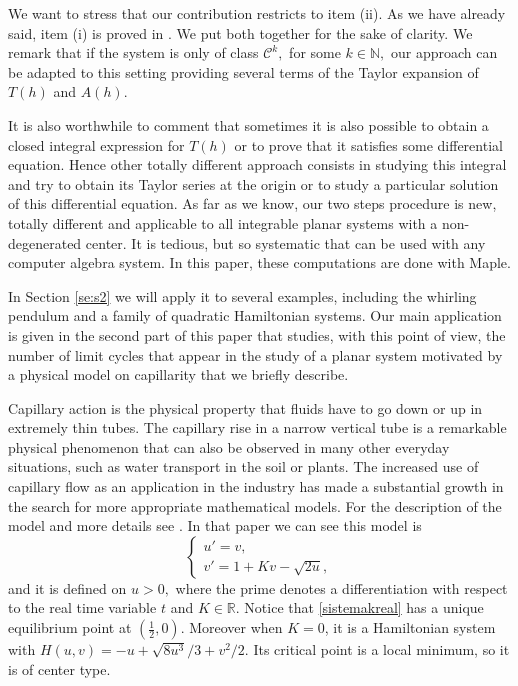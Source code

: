 \documentclass[12pt,a4paper,reqno]{amsart}
\newcommand{\R}{\mathbb{R}}
\newcommand{\N}{\mathbb{N}}
\begin{document}
We want to stress that our contribution restricts to item (ii). As
we have already said, item (i) is proved in \cite{ManVil2002}. We
put both together for the sake of clarity. We remark that if the
system is only of class $\mathcal{C}^k,$ for some $k\in\N,$ our
approach can be adapted to this setting providing several terms of
the Taylor expansion of $T(h)$ and $A(h).$

It is also  worthwhile  to comment that sometimes it is also
possible to obtain a closed integral   expression for $T(h)$ or to
prove that it satisfies some differential equation.  Hence other
totally different approach consists in studying this integral and
try to obtain its Taylor series at the origin or to study a
particular solution of this differential equation. As far as we
know, our two steps procedure is new, totally different and
applicable to all integrable planar systems with a non-degenerated
center. It is tedious, but so systematic that can be used with any
computer algebra system. In this paper, these computations are done
with Maple.

In Section \ref{se:s2} we will apply it to several examples,
including the whirling pendulum and a family of quadratic
Hamiltonian systems. Our main application is given in the second
part of this paper that studies, with this point of view, the number
of limit cycles that appear in the study of a planar  system
motivated by a physical model on capillarity that we briefly
describe.

Capillary action is the physical property that fluids have to go
down or up
    in extremely thin tubes.
     The capillary rise in a narrow vertical tube is
     a remarkable physical phenomenon that can also be observed in many other everyday situations,
      such as water transport in the soil or plants.  The increased use of capillary flow as an
       application in the industry has made a substantial growth in the search for more appropriate mathematical models.
       For the description of the model and more details see \cite{PloSwi2018}.  In that paper we
       can see this model is
\begin{equation}\label{sistemakreal}
    \left\{ \begin{array}{l}
    u'=v,\\
    v' = 1 + K v - \sqrt{2u},
    \end{array} \right.
    \end{equation}
    and it is defined on $u>0,$ where the prime denotes a differentiation with respect to the real time variable $t$ and
    $K\in\R$. Notice that \eqref{sistemakreal} has a unique equilibrium point at $\left( \frac{1}{2},0
    \right)$. Moreover when $K=0$, it is a Hamiltonian system with
 $H(u,v)=-u+\sqrt{8u^3}/3+v^2/2$.
     Its critical point is a local minimum, so it is of  center  type.
\end{document}
